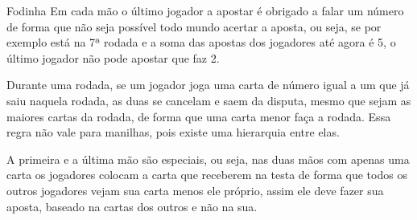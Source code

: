 \begin{subsecao}{Fodinha}
Em cada mão o último jogador a apostar é obrigado a falar um número de forma que não seja possível todo mundo acertar a 
aposta, ou seja, se por exemplo está na 7ª rodada e a soma das apostas dos jogadores até agora é 5, o último jogador não pode 
apostar que faz 2.

Durante uma rodada, se um jogador joga uma carta de número igual a um que já saiu naquela rodada, as duas se cancelam e saem da 
disputa, mesmo que sejam as maiores cartas da rodada, de forma que uma carta menor faça a rodada. Essa regra não vale para 
manilhas, pois existe uma hierarquia entre elas.

A primeira e a última mão são especiais, ou seja, nas duas mãos com apenas uma 
carta os jogadores colocam a carta que receberem na testa de forma que todos os outros jogadores 
vejam sua carta menos ele próprio, assim ele deve fazer sua aposta, baseado na cartas dos outros e não na sua.

\end{subsecao}

